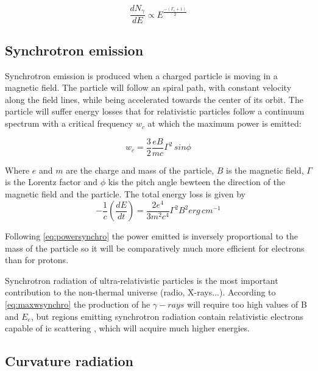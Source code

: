 \documentclass[main.tex]{subfiles}
\begin{document}
\begin{equation}
    \frac{dN_{\gamma}}{dE} \propto E^{\frac{-(\Gamma_e + 1)}{2}}
\end{equation}


\subsection{Synchrotron emission}

Synchrotron emission is produced when a charged particle is moving in a magnetic field. The particle will follow an spiral path, with constant velocity along the field lines, while being accelerated towards the center of its orbit. The particle will suffer energy losses that for relativistic particles follow a continuum spectrum \cite{weekes2003HEAstrophy} with a critical frequency $w_c$ at which the maximum power is emitted:

\begin{equation}\label{eq:maxwsynchro}
    w_c = \frac{3}{2}\frac{eB}{mc}\Gamma^2\,sin\phi
\end{equation}

Where $e$ and $m$ are the charge and mass of the particle, $B$ is the magnetic field, $\Gamma$ is the Lorentz factor and $\phi$ kis the pitch angle bewteen the direction of the magnetic field and the particle.
The total energy loss is given by
\begin{equation} \label{eq:powersynchro}
    -\frac{1}{c}\left( \frac{dE}{dt} \right) = \frac{2e^4}{3m^2c^4}\Gamma^2 B^2  erg \, cm^{-1}
\end{equation}

Following \ref{eq:powersynchro} the power emitted is inversely proportional to the mass of the particle so it will be comparatively much more efficient for electrons than for protons. 

Synchrotron radiation of ultra-relativistic particles is the most important contribution to the non-thermal universe (radio, X-rays...). According to \ref{eq:maxwsynchro} the production of \gls{he} $\gamma-rays$ will require too high values of B and $E_e$, but regions emitting synchrotron radiation contain relativistic electrons capable of \gls{ic} scattering \cite{HarwitAstroconcepts},  which will acquire much higher energies. 

\subsection{Curvature radiation}
\end{document}
